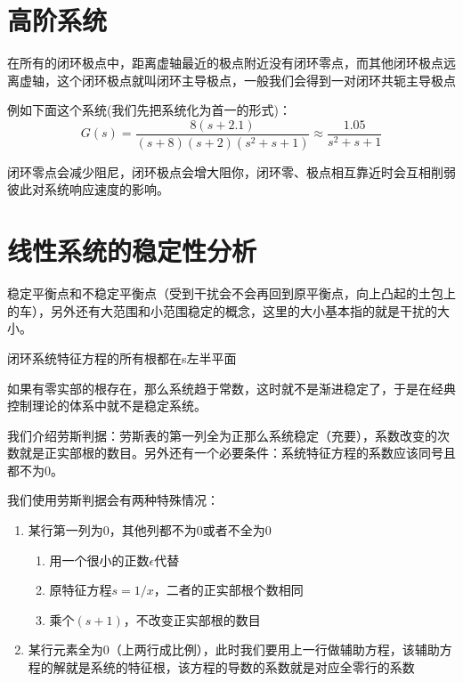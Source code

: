 \documentclass[lang=cn,10pt]{elegantbook}
\begin{document}
\section{高阶系统}
\begin{definition}[闭环主导极点]
  在所有的闭环极点中，距离虚轴最近的极点附近没有闭环零点，而其他闭环极点远离虚轴，这个闭环极点就叫闭环主导极点，一般我们会得到一对闭环共轭主导极点  
\end{definition}

例如下面这个系统(我们先把系统化为首一的形式)：
\[G(s)=\frac{8(s+2.1) }{(s+8)(s+2)(s^2+s+1)} \approx \frac{1.05}{s^2+s+1}\]

闭环零点会减少阻尼，闭环极点会增大阻你，闭环零、极点相互靠近时会互相削弱彼此对系统响应速度的影响。

\section{线性系统的稳定性分析}
稳定平衡点和不稳定平衡点（受到干扰会不会再回到原平衡点，向上凸起的土包上的车），另外还有大范围和小范围稳定的概念，这里的大小基本指的就是干扰的大小。

\begin{definition}[线性系统稳定的充要条件]
    闭环系统特征方程的所有根都在s左半平面
\end{definition}

如果有零实部的根存在，那么系统趋于常数，这时就不是渐进稳定了，于是在经典控制理论的体系中就不是稳定系统。

我们介绍劳斯判据：劳斯表的第一列全为正那么系统稳定（充要），系数改变的次数就是正实部根的数目。另外还有一个必要条件：系统特征方程的系数应该同号且都不为0。

我们使用劳斯判据会有两种特殊情况：
\begin{enumerate}
    \item 某行第一列为0，其他列都不为0或者不全为0
    \begin{enumerate}
        \item 用一个很小的正数$\epsilon$代替
        \item 原特征方程$s=1/x$，二者的正实部根个数相同
        \item 乘个$(s+1)$，不改变正实部根的数目
    \end{enumerate}
    \item 某行元素全为0（上两行成比例），此时我们要用上一行做辅助方程，该辅助方程的解就是系统的特征根，该方程的导数的系数就是对应全零行的系数
\end{enumerate}
\end{document}
